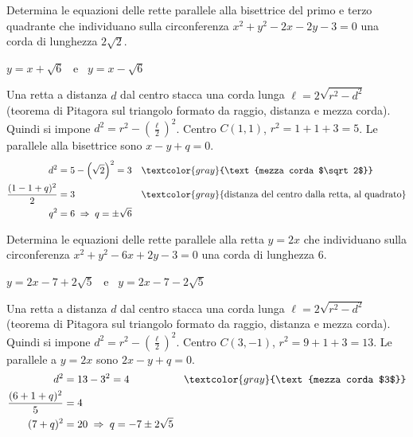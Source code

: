 \begin{question}[ID=3.12, subtitle={Corda di lunghezza $2\sqrt{2}$ parallela alla bisettrice}, difficulty=media, tags={circonferenza, corda}]
Determina le equazioni delle rette parallele alla bisettrice del primo e terzo quadrante che individuano sulla circonferenza $x^2+y^2-2x-2y-3=0$ una corda di lunghezza $2\sqrt{2}$.
\begin{solution}
$y=x+\sqrt6$ \ e \ $y=x-\sqrt6$
\end{solution}
\begin{explanation}
Una retta a distanza $d$ dal centro stacca una corda lunga $\ell=2\sqrt{r^2-d^2}$ (teorema di Pitagora sul triangolo formato da raggio, distanza e mezza corda). Quindi si impone $d^2=r^2-\left(\tfrac\ell2\right)^2$.
Centro $C(1,1)$, $r^2=1+1+3=5$. Le parallele alla bisettrice sono $x-y+q=0$.
\[\begin{aligned}
d^2 &= 5-\left(\sqrt2\right)^2=3 && \textcolor{gray}{\text{mezza corda $\sqrt2$}}\\
\dfrac{(1-1+q)^2}{2} &= 3 && \textcolor{gray}{\text{distanza del centro dalla retta, al quadrato}}\\
q^2 &= 6 \;\Rightarrow\; q=\pm\sqrt6
\end{aligned}\]
\end{explanation}
\end{question}


\begin{question}[ID=3.13, subtitle={Corda di lunghezza 6 parallela a $y=2x$ sulla circonferenza}, difficulty=media, tags={circonferenza, corda}]
Determina le equazioni delle rette parallele alla retta $y=2x$ che individuano sulla circonferenza $x^2+y^2-6x+2y-3=0$ una corda di lunghezza $6$.
\begin{solution}
$y=2x-7+2\sqrt5$ \ e \ $y=2x-7-2\sqrt5$
\end{solution}
\begin{explanation}
Una retta a distanza $d$ dal centro stacca una corda lunga $\ell=2\sqrt{r^2-d^2}$ (teorema di Pitagora sul triangolo formato da raggio, distanza e mezza corda). Quindi si impone $d^2=r^2-\left(\tfrac\ell2\right)^2$.
Centro $C(3,-1)$, $r^2=9+1+3=13$. Le parallele a $y=2x$ sono $2x-y+q=0$.
\[\begin{aligned}
d^2 &= 13-3^2=4 && \textcolor{gray}{\text{mezza corda $3$}}\\
\dfrac{(6+1+q)^2}{5} &= 4\\
(7+q)^2 &= 20 \;\Rightarrow\; q=-7\pm2\sqrt5
\end{aligned}\]
\end{explanation}
\end{question}

